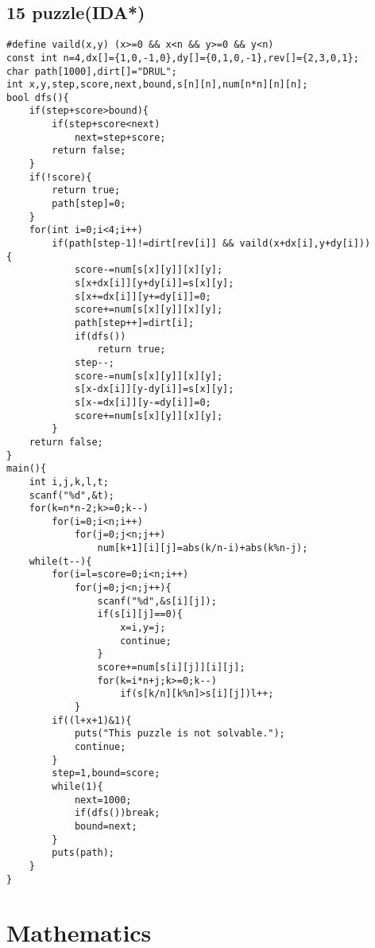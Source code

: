 \documentclass[9pt,a4paper,twocolumn,oneside]{article}
\begin{document}
\subsection{15 puzzle(IDA*)}
\begin{verbatim}
#define vaild(x,y) (x>=0 && x<n && y>=0 && y<n)
const int n=4,dx[]={1,0,-1,0},dy[]={0,1,0,-1},rev[]={2,3,0,1};
char path[1000],dirt[]="DRUL";
int x,y,step,score,next,bound,s[n][n],num[n*n][n][n];
bool dfs(){
    if(step+score>bound){
        if(step+score<next)
            next=step+score;
        return false;
    }
    if(!score){
        return true;
        path[step]=0;
    }
    for(int i=0;i<4;i++)
        if(path[step-1]!=dirt[rev[i]] && vaild(x+dx[i],y+dy[i]))        {
            score-=num[s[x][y]][x][y];
            s[x+dx[i]][y+dy[i]]=s[x][y];
            s[x+=dx[i]][y+=dy[i]]=0;
            score+=num[s[x][y]][x][y];
            path[step++]=dirt[i];
            if(dfs())
                return true;
            step--;
            score-=num[s[x][y]][x][y];
            s[x-dx[i]][y-dy[i]]=s[x][y];
            s[x-=dx[i]][y-=dy[i]]=0;
            score+=num[s[x][y]][x][y];
        }
    return false;
}
main(){
    int i,j,k,l,t;
    scanf("%d",&t);
    for(k=n*n-2;k>=0;k--)
        for(i=0;i<n;i++)
            for(j=0;j<n;j++)
                num[k+1][i][j]=abs(k/n-i)+abs(k%n-j);
    while(t--){
        for(i=l=score=0;i<n;i++)
            for(j=0;j<n;j++){
                scanf("%d",&s[i][j]);
                if(s[i][j]==0){
                    x=i,y=j;
                    continue;
                }
                score+=num[s[i][j]][i][j];
                for(k=i*n+j;k>=0;k--)
                    if(s[k/n][k%n]>s[i][j])l++;
            }
        if((l+x+1)&1){
            puts("This puzzle is not solvable.");
            continue;
        }
        step=1,bound=score;
        while(1){
            next=1000;
            if(dfs())break;
            bound=next;
        }
        puts(path);
    }
}

\end{verbatim}

\section{Mathematics}
\end{document}
